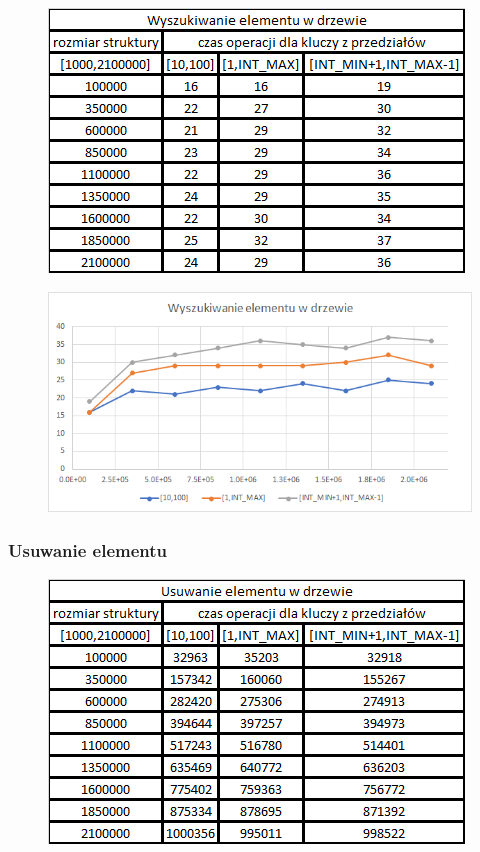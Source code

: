 \documentclass{article}
\begin{document}
\begin{figure}[h!]

\includegraphics{images/wyszukiwanie_drzewo.png}

\end{figure}

\begin{figure}[h!]
\includegraphics[width=11.3cm]{images/wyszukiwanie_drzewo_w.png}
\end{figure}

\newpage

\subsubsection*{Usuwanie elementu}

\begin{figure}[h!]

\includegraphics{images/usuwanie_drzewo.png}

\end{figure}
\end{document}
